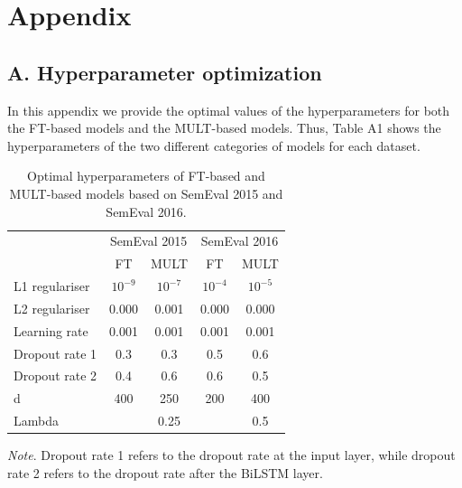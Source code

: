 \section*{Appendix}
\subsection*{A. Hyperparameter optimization}
\renewcommand{\thefigure}{A\arabic{figure}}
\setcounter{figure}{0}
\renewcommand{\thetable}{A\arabic{table}}
\setcounter{table}{0}

In this appendix we provide the optimal values of the hyperparameters for both the FT-based models and the MULT-based models. Thus, Table A1 shows the hyperparameters of the two different categories of models for each dataset. 

\begin{table}[h]
\caption{Optimal hyperparameters of FT-based and MULT-based models based on SemEval 2015 and SemEval 2016.}
\label{tab:hyperparams}
\setlength{\tabcolsep}{24pt}
\begin{tabular}{@{}lcccc@{}}
\toprule
               & \multicolumn{2}{c}{SemEval 2015} & \multicolumn{2}{c}{SemEval 2016} \\ \cmidrule(l){2-5} 
               & FT              & MULT           & FT              & MULT           \\ \midrule
L1 regulariser & $10^{-9}$           & $10^{-7}$          & $10^{-4}$           & $10^{-5}$          \\
L2 regulariser & 0.000           & 0.001          & 0.000           & 0.000          \\
Learning rate  & 0.001           & 0.001          & 0.001           & 0.001          \\
Dropout rate 1 & 0.3             & 0.3            & 0.5             & 0.6            \\
Dropout rate 2 & 0.4             & 0.6            & 0.6             & 0.5            \\
d   & 400             & 250            & 200             & 400            \\
Lambda         &                 & 0.25           &                 & 0.5            \\ \bottomrule
\end{tabular}
\footnotesize\textit{Note}. Dropout rate 1 refers to the dropout rate at the input layer, while dropout rate 2 refers to the dropout rate after the BiLSTM layer.
\end{table}

